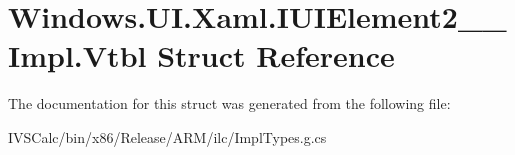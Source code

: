 \hypertarget{struct_windows_1_1_u_i_1_1_xaml_1_1_i_u_i_element2_____impl_1_1_vtbl}{}\section{Windows.\+U\+I.\+Xaml.\+I\+U\+I\+Element2\+\_\+\+\_\+\+Impl.\+Vtbl Struct Reference}
\label{struct_windows_1_1_u_i_1_1_xaml_1_1_i_u_i_element2_____impl_1_1_vtbl}


The documentation for this struct was generated from the following file\+:\begin{DoxyCompactItemize}
\item 
I\+V\+S\+Calc/bin/x86/\+Release/\+A\+R\+M/ilc/Impl\+Types.\+g.\+cs\end{DoxyCompactItemize}
